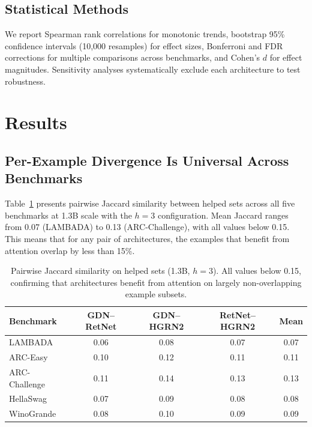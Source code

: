 \documentclass[11pt]{article}
\begin{document}
\subsection{Statistical Methods}

We report Spearman rank correlations for monotonic trends, bootstrap 95\% confidence intervals (10,000 resamples) for effect sizes, Bonferroni and FDR corrections for multiple comparisons across benchmarks, and Cohen's $d$ for effect magnitudes. Sensitivity analyses systematically exclude each architecture to test robustness.

\section{Results}

\subsection{Per-Example Divergence Is Universal Across Benchmarks}
\label{sec:divergence}

Table~\ref{tab:jaccard_benchmarks} presents pairwise Jaccard similarity between helped sets across all five benchmarks at 1.3B scale with the $h=3$ configuration. Mean Jaccard ranges from 0.07 (LAMBADA) to 0.13 (ARC-Challenge), with all values below 0.15. This means that for any pair of architectures, the examples that benefit from attention overlap by less than 15\%.

\begin{table}[t]
\centering
\caption{Pairwise Jaccard similarity on helped sets (1.3B, $h=3$). All values below 0.15, confirming that architectures benefit from attention on largely non-overlapping example subsets.}
\label{tab:jaccard_benchmarks}
\begin{tabular}{lcccc}
\toprule
Benchmark & GDN--RetNet & GDN--HGRN2 & RetNet--HGRN2 & Mean \\
\midrule
LAMBADA & 0.06 & 0.08 & 0.07 & 0.07 \\
ARC-Easy & 0.10 & 0.12 & 0.11 & 0.11 \\
ARC-Challenge & 0.11 & 0.14 & 0.13 & 0.13 \\
HellaSwag & 0.07 & 0.09 & 0.08 & 0.08 \\
WinoGrande & 0.08 & 0.10 & 0.09 & 0.09 \\
\bottomrule
\end{tabular}
\end{table}
\end{document}
